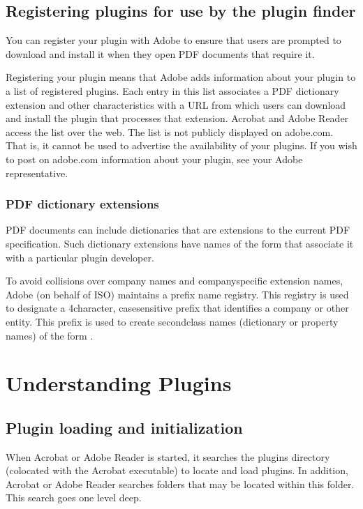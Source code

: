 \documentclass[letterpaper,12pt,english,openany,oneside]{sphinxmanual}
\begin{document}
\section{Registering plugins for use by the plugin finder}
\label{\detokenize{index:registering-plugins-for-use-by-the-plugin-finder}}
You can register your plugin with Adobe to ensure that users are prompted to download and install it when they open PDF documents that require it.

Registering your plugin means that Adobe adds information about your plugin to a list of registered plugins. Each entry in this list associates a PDF dictionary extension and other characteristics with a URL from which users can download and install the plugin that processes that extension. Acrobat and Adobe Reader access the list over the web. The list is not publicly displayed on adobe.com. That is, it cannot be used to advertise the availability of your plugins. If you wish to post on adobe.com information about your plugin, see your Adobe representative.


\subsection{PDF dictionary extensions}
\label{\detokenize{index:pdf-dictionary-extensions}}
PDF documents can include dictionaries that are extensions to the current PDF specification. Such dictionary extensions have names of the form  that associate it with a particular plug\sphinxhyphen{}in developer.

To avoid collisions over company names and company\sphinxhyphen{}specific extension names, Adobe (on behalf of ISO) maintains a prefix name registry. This registry is used to designate a 4\sphinxhyphen{}character, case\sphinxhyphen{}sensitive prefix that identifies a company or other entity. This prefix is used to create second\sphinxhyphen{}class names (dictionary or property names) of the form .


\chapter{Understanding Plugins}
\label{\detokenize{Plugins_Pimech:understanding-plugins}}\label{\detokenize{Plugins_Pimech::doc}}

\section{Plugin loading and initialization}
\label{\detokenize{Plugins_Pimech:plugin-loading-and-initialization}}
When Acrobat or Adobe Reader is started, it searches the plugins directory (co\sphinxhyphen{}located with the Acrobat executable) to locate and load plugins. In addition, Acrobat or Adobe Reader searches folders that may be located within this folder. This search goes one level deep.
\end{document}
